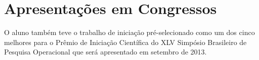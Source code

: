 \section{Apresentações em Congressos}
O aluno também teve o trabalho de iniciação pré-selecionado como um dos cinco
melhores para o Prêmio de Iniciação Científica do XLV Simpósio Brasileiro de
Pesquisa Operacional que será apresentado em setembro de 2013.

